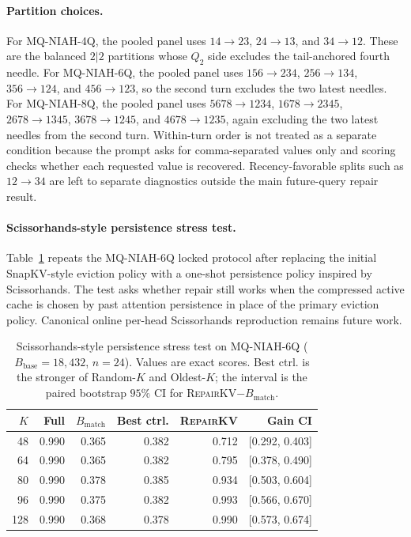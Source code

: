 \documentclass{article}
\newcommand{\repairkv}{\textsc{RepairKV}}
\newcommand{\bbase}{\ensuremath{B_{\mathrm{base}}}}
\newcommand{\bmatch}{\ensuremath{B_{\mathrm{match}}}}
\begin{document}
\paragraph{Partition choices.}
For MQ-NIAH-4Q, the pooled panel uses
$14{\rightarrow}23$, $24{\rightarrow}13$, and
$34{\rightarrow}12$.
These are the balanced $2|2$ partitions whose $Q_2$ side excludes the
tail-anchored fourth needle.
For MQ-NIAH-6Q, the pooled panel uses
$156{\rightarrow}234$, $256{\rightarrow}134$,
$356{\rightarrow}124$, and $456{\rightarrow}123$, so the second turn
excludes the two latest needles.
For MQ-NIAH-8Q, the pooled panel uses
$5678{\rightarrow}1234$, $1678{\rightarrow}2345$,
$2678{\rightarrow}1345$, $3678{\rightarrow}1245$, and
$4678{\rightarrow}1235$, again excluding the two latest needles from the
second turn.
Within-turn order is not treated as a separate condition because the
prompt asks for comma-separated values only and scoring checks whether
each requested value is recovered.
Recency-favorable splits such as $12{\rightarrow}34$ are left to
separate diagnostics outside the main future-query repair result.

\paragraph{Scissorhands-style persistence stress test.}
Table~\ref{tab:app-scissorhands-stress} repeats the MQ-NIAH-6Q locked
protocol after replacing the initial SnapKV-style eviction policy with a
one-shot persistence policy inspired by Scissorhands.
The test asks whether repair still works when the compressed active cache
is chosen by past attention persistence in place of the primary eviction
policy.
Canonical online per-head Scissorhands reproduction remains future work.

\begin{table}[H]
  \centering
  \caption{Scissorhands-style persistence stress test on
  MQ-NIAH-6Q ($\bbase{=}18{,}432$, $n{=}24$). Values are exact scores. Best
  ctrl. is the stronger of Random-$K$ and Oldest-$K$; the interval is the
  paired bootstrap $95\%$ CI for \repairkv{}$-\bmatch$.}
  \label{tab:app-scissorhands-stress}
  \small
  \begin{tabular}{rrrrrr}
    \toprule
    $K$ & Full & $\bmatch$ & Best ctrl. & \repairkv{} & Gain CI \\
    \midrule
    48 & 0.990 & 0.365 & 0.382 & 0.712 & [0.292, 0.403] \\
    64 & 0.990 & 0.365 & 0.382 & 0.795 & [0.378, 0.490] \\
    80 & 0.990 & 0.378 & 0.385 & 0.934 & [0.503, 0.604] \\
    96 & 0.990 & 0.375 & 0.382 & 0.993 & [0.566, 0.670] \\
    128 & 0.990 & 0.368 & 0.378 & 0.990 & [0.573, 0.674] \\
    \bottomrule
  \end{tabular}
\end{table}
\end{document}
